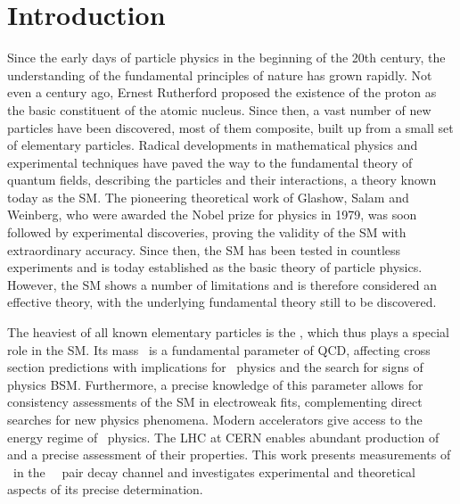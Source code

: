 \chapter{Introduction}
\label{chap:intro}
%
Since the early days of particle physics in the beginning of the 20th century, the understanding of the fundamental principles of nature has grown rapidly. Not even a century ago, Ernest Rutherford proposed the existence of the proton as the basic constituent of the atomic nucleus. Since then, a vast number of new particles have been discovered, most of them composite, built up from a small set of elementary particles. Radical developments in mathematical physics and experimental techniques have paved the way to the fundamental theory of quantum fields, describing the particles and their interactions, a theory known today as the \gls{SM}. 
%
The pioneering theoretical work of Glashow, Salam and Weinberg, who were awarded the Nobel prize for physics in 1979, was soon followed by experimental discoveries, proving the validity of the \gls{SM} with extraordinary accuracy. Since then, the \gls{SM} has been tested in countless experiments and is today established as the basic theory of particle physics. However, the \gls{SM} shows a number of limitations and is therefore considered an effective theory, with the underlying fundamental theory still to be discovered. 


The heaviest of all known elementary particles is the \tquark, which thus plays a special role in the \gls{SM}. Its mass \mt\ is a fundamental parameter of \gls{QCD}, affecting cross section predictions with implications for \Hboson\ physics and the search for signs of physics \gls{BSM}. Furthermore, a precise knowledge of this parameter allows for consistency assessments of the \gls{SM} in electroweak fits, complementing direct searches for new physics phenomena. 
%
Modern accelerators give access to the energy regime of \tquark\ physics. The \gls{LHC} at \gls{CERN} enables abundant production of  and a precise assessment of their properties.
%
This work presents measurements of \mt\ in the \dileptonic\ \tquark\ pair decay channel and investigates experimental and theoretical aspects of its precise determination. 


